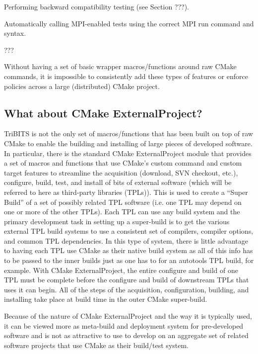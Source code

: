 \documentclass[note]{TechNote}
\begin{document}
\begin{compactitem}
\item Performing backward compatibility testing (see Section ???).
\item Automatically calling MPI-enabled tests using the correct MPI run command and syntax.
\item ???
\end{compactitem}

Without having a set of basic wrapper macros/functions around raw CMake commands, it is impossible to consistently add these types of features or enforce policies across a large (distributed) CMake project.

%
\subsection{What about CMake ExternalProject?}
\label{sec:what_about_cmake_externalproject}
%

TriBITS is not the only set of macros/functions that has been built on top of raw CMake to enable the building and installing of large pieces of developed software.  In particular, there is the standard CMake ExternalProject module that provides a set of macros and functions that use CMake's custom command and custom target features to streamline the acquisition (download, SVN checkout, etc.), configure, build, test, and install of bits of external software (which will be referred to here as third-party libraries (TPLs)).  This is used to create a ``Super Build'' of a set of possibly related TPL software (i.e. one TPL may depend on one or more of the other TPLs).  Each TPL can use any build system and the primary development task in setting up a super-build is to get the various external TPL build systems to use a consistent set of compilers, compiler options, and common TPL dependencies.  In this type of system, there is little advantage to having each TPL use CMake as their native build system as all of this info has to be passed to the inner builds just as one has to for an autotools TPL build, for example.  With CMake ExternalProject, the entire configure and build of one TPL must be complete before the configure and build of downstream TPLs that uses it can begin.  All of the steps of the acquisition, configuration, building, and installing take place at build time in the outer CMake super-build.

Because of the nature of CMake ExternalProject and the way it is typically used, it can be viewed more as meta-build and deployment system for pre-developed software and is not as attractive to use to develop on an aggregate set of related software projects that use CMake as their build/test system.
\end{document}
